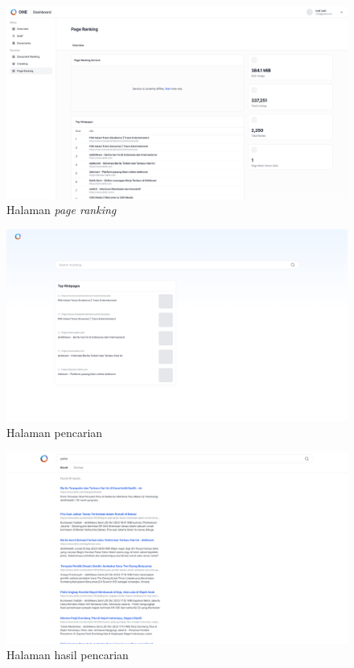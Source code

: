 \documentclass[
	a4paper, %
	10pt, %
	unnumberedsections, %
	twoside, %
]{LTJournalArticle}
\begin{document}
\begin{figure}[H]
\includegraphics[width=\linewidth]{view_page_ranking_overview.png}
\caption{Halaman \textit{page ranking}}
\label{gambar:halaman_page_ranking}
\end{figure}
\begin{figure}[H]
\includegraphics[width=\linewidth]{view_search_engine_home.png}
\caption{Halaman pencarian}
\label{gambar:halaman_search_engine}
\end{figure}
\begin{figure}[H]
\includegraphics[width=\linewidth]{view_search_engine_result.png}
\caption{Halaman hasil pencarian}
\label{gambar:halaman_hasil_pencarian}
\end{figure}
\end{document}
